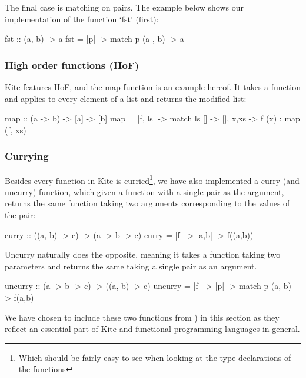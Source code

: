 The final case is matching on pairs. The example below shows our implementation of the function `fst' (first):
\begin{kite}

fst :: (a, b) -> a
fst = |p| -> {
  match p {
    (a , b) -> a
  }
}
\end{kite}

\subsubsection{High order functions (HoF)}
Kite features HoF, and the map-function is an example hereof. It takes a function and applies to every element of a list and returns the modified list:

\begin{kite}

map :: (a -> b) -> [a] -> [b]
map = |f, ls| -> {
  match ls {
    [] -> [],
    x,xs -> f (x) : map (f, xs)
  }
}
\end{kite}

\subsubsection{Currying}
\label{subsubsec:currying}
Besides every function in Kite is curried\footnote{Which should be fairly easy to see when looking at the type-declarations of the functions}, we have also implemented a curry (and uncurry) function, which given a function with a single pair as the argument, returns the same function taking two arguments corresponding to the values of the pair:

\begin{kite}

curry :: ((a, b) -> c) -> (a -> b -> c)
curry = |f| -> {
  |a,b| -> {
    f((a,b))
  }       
}
\end{kite}

Uncurry naturally does the opposite, meaning it takes a function taking two parameters and returns the same taking a single pair as an argument.

\begin{kite}

uncurry :: (a -> b -> c) -> ((a, b) -> c)
uncurry = |f| -> {
  |p| -> {
    match p {
      (a, b) -> f(a,b)
    }         
  } 
}
\end{kite}

We have chosen to include these two functions from ) in this section as they reflect an essential part of Kite and functional programming languages in general.

